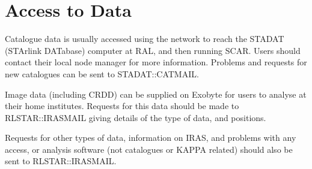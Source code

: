 \documentclass[11pt,nolof,noabs]{starlink}
\begin{document}
\section{Access to Data}
Catalogue data is usually accessed using the network to reach the STADAT
(STArlink DATabase) computer at RAL, and then running SCAR.
Users should contact their local node manager for more information.
Problems and requests for new catalogues can be sent to STADAT::CATMAIL.

Image data (including CRDD) can be supplied on Exobyte for users to analyse at
their home institutes. Requests for this data should be made to RLSTAR::IRASMAIL
giving details of the type of data, and positions.

Requests for other types of data, information on IRAS, and problems with any
access, or analysis software (not catalogues or KAPPA related) should also
be sent to RLSTAR::IRASMAIL.
\end{document}
